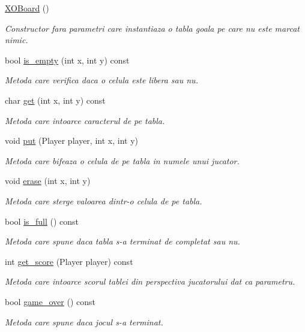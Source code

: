 \begin{DoxyCompactItemize}
\item 
\hypertarget{classXOBoard_a5740df9f6637e64adb7745228820b608}{
\hyperlink{classXOBoard_a5740df9f6637e64adb7745228820b608}{XOBoard} ()}
\label{classXOBoard_a5740df9f6637e64adb7745228820b608}

\begin{DoxyCompactList}\small\item\em Constructor fara parametri care instantiaza o tabla goala pe care nu este marcat nimic. \end{DoxyCompactList}\item 
bool \hyperlink{classXOBoard_afc284df051b707b824bc8289e5bffd22}{is\_\-empty} (int x, int y) const 
\begin{DoxyCompactList}\small\item\em Metoda care verifica daca o celula este libera sau nu. \end{DoxyCompactList}\item 
char \hyperlink{classXOBoard_a850b7cbdb93c080eb7db8d749bf1aafa}{get} (int x, int y) const 
\begin{DoxyCompactList}\small\item\em Metoda care intoarce caracterul de pe tabla. \end{DoxyCompactList}\item 
void \hyperlink{classXOBoard_a3190b1cd4b6d1665bb0b6c35411d0c3e}{put} (Player player, int x, int y)
\begin{DoxyCompactList}\small\item\em Metoda care bifeaza o celula de pe tabla in numele unui jucator. \end{DoxyCompactList}\item 
void \hyperlink{classXOBoard_a6e72af673a48b7a4de79d7b738a690c1}{erase} (int x, int y)
\begin{DoxyCompactList}\small\item\em Metoda care sterge valoarea dintr-\/o celula de pe tabla. \end{DoxyCompactList}\item 
bool \hyperlink{classXOBoard_a58b290b18786b246c9051958819b1d4f}{is\_\-full} () const 
\begin{DoxyCompactList}\small\item\em Metoda care spune daca tabla s-\/a terminat de completat sau nu. \end{DoxyCompactList}\item 
int \hyperlink{classXOBoard_a8affd589eb32be52b4a58cdb487eaee5}{get\_\-score} (Player player) const 
\begin{DoxyCompactList}\small\item\em Metoda care intoarce scorul tablei din perspectiva jucatorului dat ca parametru. \end{DoxyCompactList}\item 
bool \hyperlink{classXOBoard_a370ede47b6df0227f809d0f39f06e2c6}{game\_\-over} () const 
\begin{DoxyCompactList}\small\item\em Metoda care spune daca jocul s-\/a terminat. \end{DoxyCompactList}\end{DoxyCompactItemize}
